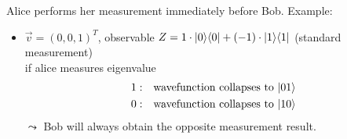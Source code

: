 Alice performs her measurement immediately before Bob.
Example:
\begin{itemize}
    \item $\vec{v} = (0, 0, 1)^T$, observable $Z = 1 \cdot \lvert0\rangle \langle0\rvert + (-1) \cdot \lvert1\rangle \langle1\rvert$
        (standard measurement) \\
        if alice measures eigenvalue
        \begin{align*}
            1: &\quad \text{wavefunction collapses to } \lvert01\rangle \\
            0: &\quad \text{wavefunction collapses to } \lvert10\rangle
        \end{align*}
        $\leadsto$ Bob will always obtain the opposite measurement result.
\end{itemize}